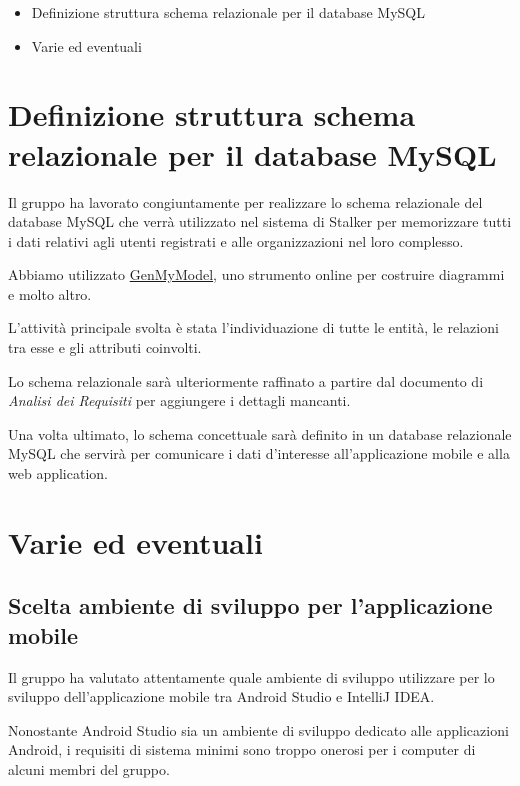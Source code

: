 \documentclass{article}
\begin{document}
\begin{itemize}
  \item Definizione struttura schema relazionale per il database MySQL
  \item Varie ed eventuali
\end{itemize}

\section{Definizione struttura schema relazionale per il database MySQL}%
\label{sec:definizione_struttura_schema_relazionale_per_il_database_MySQL}
Il gruppo ha lavorato congiuntamente per realizzare lo schema relazionale del database MySQL che verrà utilizzato nel sistema di Stalker per memorizzare tutti i dati relativi agli utenti registrati e alle organizzazioni nel loro complesso.

Abbiamo utilizzato \href{https://www.genmymodel.com/}{GenMyModel}, uno strumento online per costruire diagrammi e molto altro.

L'attività principale svolta è stata l'individuazione di tutte le entità, le relazioni tra esse e gli attributi coinvolti.

Lo schema relazionale sarà ulteriormente raffinato a partire dal documento di \textit{Analisi dei Requisiti} per aggiungere i dettagli mancanti.

Una volta ultimato, lo schema concettuale sarà definito in un database relazionale MySQL che servirà per comunicare i dati d'interesse all'applicazione mobile e alla web application.


\section{Varie ed eventuali}%
\label{sec:varie_ed_eventuali}

\subsection{Scelta ambiente di sviluppo per l'applicazione mobile}%
\label{sub:scelta_ambiente_di_sviluppo_per_applicazione_mobile}
Il gruppo ha valutato attentamente quale ambiente di sviluppo utilizzare per lo sviluppo dell'applicazione mobile tra Android Studio e IntelliJ IDEA\@.

Nonostante Android Studio sia un ambiente di sviluppo dedicato alle applicazioni Android, i requisiti di sistema minimi sono troppo onerosi per i computer di alcuni membri del gruppo.
\end{document}
